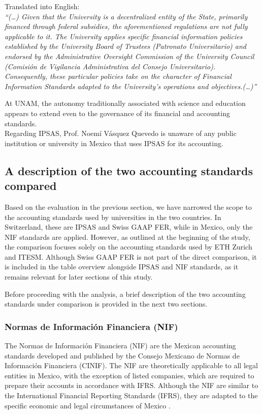 \documentclass[10pt]{article}
\begin{document}
Translated into English:\\
\textit{“{}(…) Given that the University is a decentralized entity of the State, primarily financed through federal subsidies, the aforementioned regulations are not fully applicable to it. The University applies specific financial information policies established by the University Board of Trustees (Patronato Universitario) and endorsed by the Administrative Oversight Commission of the University Council (Comisión de Vigilancia Administrativa del Consejo Universitario). Consequently, these particular policies take on the character of Financial Information Standards adapted to the University's operations and objectives.(…)”{}}

At UNAM, the autonomy traditionally associated with science and education appears to extend even to the governance of its financial and accounting standards.\\


Regarding IPSAS, Prof. Noemí Vásquez Quevedo is unaware of any public institution or university in Mexico that uses IPSAS for its accounting.

\subsection{A description of the two accounting standards compared}\label{subsec:a_description_of_the_two_accounting_standards_compared}
Based on the evaluation in the previous section, we have narrowed the scope to the accounting standards used by universities in the two countries. In Switzerland, these are IPSAS and Swiss GAAP FER, while in Mexico, only the NIF standards are applied. However, as outlined at the beginning of the study, the comparison focuses solely on the accounting standards used by ETH Zurich and ITESM. Although Swiss GAAP FER is not part of the direct comparison, it is included in the table overview alongside IPSAS and NIF standards, as it remains relevant for later sections of this study.

Before proceeding with the analysis, a brief description of the two accounting standards under comparison is provided in the next two sections.

\subsubsection{Normas de Información Financiera (NIF)}\label{subsubsec:normas_de_informacion_financiera__nif_}
The Normas de Información Financiera (NIF) are the Mexican accounting standards developed and published by the Consejo Mexicano de Normas de Información Financiera (CINIF). The NIF are theoretically applicable to all legal entities in Mexico, with the exception of listed companies, which are required to prepare their accounts in accordance with IFRS. Although the NIF are similar to the International Financial Reporting Standards (IFRS), they are adapted to the specific economic and legal circumstances of Mexico \cite{NIFWiki}.
\end{document}
